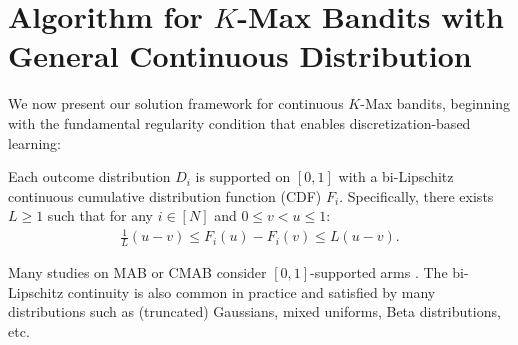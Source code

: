 \section{Algorithm for $K$-Max Bandits with General Continuous Distribution}\label{sec:general-continuous}

We now present our solution framework for continuous $K$-Max bandits, beginning with the fundamental regularity condition that enables discretization-based learning:
\begin{assumption}\label{ass:bi-lipschitz}
Each outcome distribution $D_i$ is supported on $[0,1]$ with a bi-Lipschitz continuous cumulative distribution function (CDF) $F_i$. Specifically, there exists $L \geq 1$ such that for any $i \in [N]$ and $0 \leq v < u \leq 1$:
\begin{align*}
    \frac{1}{L}(u - v) \leq F_i(u) - F_i(v) \leq L(u - v).
\end{align*}
\end{assumption}
Many studies on MAB or CMAB consider $[0, 1]$-supported arms \citep{abbasi2011improved,chen2013combinatorial,slivkins2019introduction,lattimore2020bandit}. The bi-Lipschitz continuity is also common in practice \citep{li2017provably,wang2019optimism,liu2023optimistic} and satisfied by many distributions such as (truncated) Gaussians, mixed uniforms, Beta distributions, etc.


